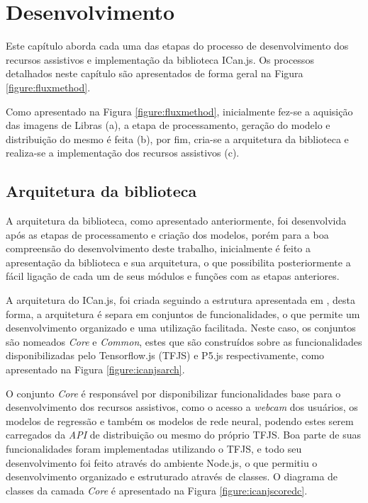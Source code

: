 \newpage
\chapter{Desenvolvimento}
\label{ch:desenvolvimento}

\par Este capítulo aborda cada uma das etapas do processo de desenvolvimento dos recursos assistivos e implementação da biblioteca ICan.js. Os processos detalhados neste capítulo são apresentados de forma geral na Figura \ref{figure:fluxmethod}.


\par Como apresentado na Figura \ref{figure:fluxmethod}, inicialmente fez-se a aquisição das imagens de Libras (a), a etapa de processamento, geração do modelo e distribuição do mesmo é feita (b), por fim, cria-se a arquitetura da biblioteca e realiza-se a implementação dos recursos assistivos (c).

\section{Arquitetura da biblioteca}

\par A arquitetura da biblioteca, como apresentado anteriormente, foi desenvolvida após as etapas de processamento e criação dos modelos, porém para a boa compreensão do desenvolvimento deste trabalho, inicialmente é feito a apresentação da biblioteca e sua arquitetura, o que possibilita posteriormente a fácil ligação de cada um de seus módulos e funções com as etapas anteriores. 

\par A arquitetura do ICan.js, foi criada seguindo a estrutura apresentada em \cite{tensorflowjs2019}, desta forma, a arquitetura é separa em conjuntos de funcionalidades, o que permite um desenvolvimento organizado e uma utilização facilitada. Neste caso, os conjuntos são nomeados \textit{Core} e \textit{Common}, estes que são construídos sobre as funcionalidades disponibilizadas pelo Tensorflow.js (TFJS) e P5.js respectivamente, como apresentado na Figura \ref{figure:icanjsarch}.


\par O conjunto \textit{Core} é responsável por disponibilizar funcionalidades base para o desenvolvimento dos recursos assistivos, como o acesso a \textit{webcam} dos usuários, os modelos de regressão e também os modelos de rede neural, podendo estes serem carregados da \textit{API} de distribuição ou mesmo do próprio TFJS. Boa parte de suas funcionalidades foram implementadas utilizando o TFJS, e todo seu desenvolvimento foi feito através do ambiente Node.js, o que permitiu o desenvolvimento organizado e estruturado através de classes. O diagrama de classes da camada \textit{Core} é apresentado na Figura \ref{figure:icanjscoredc}.

